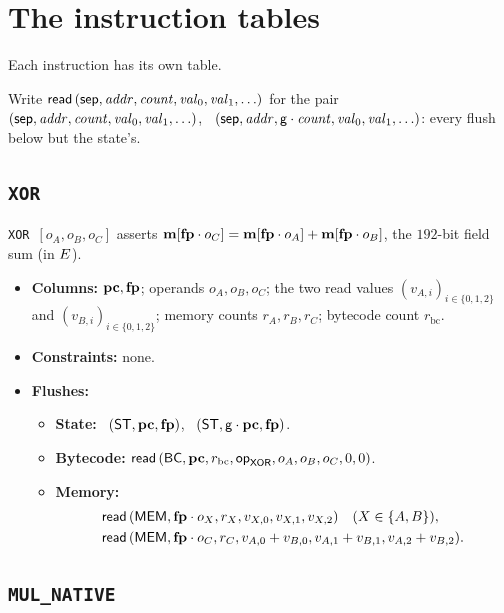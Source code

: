\section{The instruction tables}\label{sec:tables}

Each instruction has its own table.

Write $\rdf{\sep,\addr,\cnt,\val_0,\val_1, \dots}$ for the pair \pull\ $\tup{\sep,\addr,\cnt,\val_0,\val_1, \dots }$, \push\ $\tup{\sep,\addr,\gen\cdot\cnt,\val_0,\val_1, \dots}$: every flush below but the state's.

\subsection{\texttt{XOR}}\label{sec:tab-xor}

\texttt{XOR}\ $[o_A,o_B,o_C]$ asserts $\mathbf{m}[\mathbf{fp}\cdot o_C]=\mathbf{m}[\mathbf{fp}\cdot o_A]+\mathbf{m}[\mathbf{fp}\cdot o_B]$, the $192$-bit field sum (in $E$).
\begin{itemize}
\item \textbf{Columns:} $\mathbf{pc},\mathbf{fp}$; operands $o_A,o_B,o_C$; the two read values $(v_{A,i})_{i\in\{0,1,2\}}$ and $(v_{B,i})_{i\in\{0,1,2\}}$; memory counts $r_A,r_B,r_C$; bytecode count $r_{\mathrm{bc}}$.
\item \textbf{Constraints:} none.
\item \textbf{Flushes:}
  \begin{itemize}
  \item \textbf{State:} \pull\ $( \mathsf{ST},\mathbf{pc},\mathbf{fp} )$, \push\ $( \mathsf{ST},\mathsf{g}\cdot\mathbf{pc},\mathbf{fp} )$.
  \item \textbf{Bytecode:} $\mathsf{read}\,( \mathsf{BC},\mathbf{pc},r_{\mathrm{bc}},\mathsf{op}_{\mathsf{XOR}},o_A,o_B,o_C,0,0 )$.
  \item \textbf{Memory:}
    \begin{align*}
      &\mathsf{read}\,( \mathsf{MEM},\mathbf{fp}\cdot o_X,r_X,v_{X,0},v_{X,1},v_{X,2} )\quad(X\in\{A,B\}),\\
      &\mathsf{read}\,( \mathsf{MEM},\mathbf{fp}\cdot o_C,r_C,v_{A,0}+v_{B,0},v_{A,1}+v_{B,1},v_{A,2}+v_{B,2} ).
    \end{align*}
  \end{itemize}
\end{itemize}

\subsection{\texttt{MUL\_NATIVE}}\label{sec:tab-mul}

